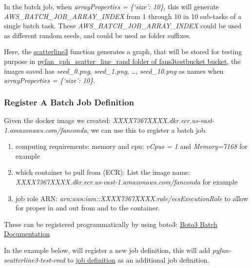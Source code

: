 \documentclass[
]{book}
\providecommand{\tightlist}{%
  \setlength{\itemsep}{0pt}\setlength{\parskip}{0pt}}
\begin{document}
In the batch job, when \emph{arrayProperties = \{`size': 10\}}, this will generate \emph{AWS\_BATCH\_JOB\_ARRAY\_INDEX} from 1 through 10 in 10 sub-tasks of a single batch task. These \emph{AWS\_BATCH\_JOB\_ARRAY\_INDEX} could be used as different random seeds, and could be used as folder suffixes.

Here, the \href{https://github.com/FanWangEcon/pyfan/blob/master/pyfan/graph/exa/scatterline3.py}{scatterline3} function generates a graph, that will be stored for testing purpose in \href{https://s3.console.aws.amazon.com/s3/buckets/fans3testbucket/pyfan_gph_scatter_line_rand/?region=us-east-1\&tab=overview}{pyfan\_gph\_scatter\_line\_rand folder of fans3testbucket bucket}, the images saved has \emph{seed\_0.png}, \emph{seed\_1.png}, \ldots, \emph{seed\_10.png} as names when \emph{arrayProperties = \{`size': 10\}}.

\hypertarget{register-a-batch-job-definition}{%
\subsubsection{Register A Batch Job Definition}\label{register-a-batch-job-definition}}

Given the docker image we created: \emph{XXXX7367XXXX.dkr.ecr.us-east-1.amazonaws.com/fanconda}, we can use this to register a batch job.

\begin{enumerate}
\def\labelenumi{\arabic{enumi}.}
\tightlist
\item
  computing requirements: memory and cpu: \emph{vCpus = 1} and \emph{Memory=7168} for example
\item
  which container to pull from (ECR): List the image name: \emph{XXXX7367XXXX.dkr.ecr.us-east-1.amazonaws.com/fanconda} for example
\item
  job role ARN: \emph{arn:aws:iam::XXXX7367XXXX:role/ecsExecutionRole} to allow for proper in and out from and to the container.
\end{enumerate}

These can be registered programmatically by using boto3: \href{https://boto3.amazonaws.com/v1/documentation/api/latest/reference/services/batch.html}{Boto3 Batch Documentation}

In the example below, will register a new job definition, this will add \emph{pyfan-scatterline3-test-rmd} to \href{https://console.aws.amazon.com/batch/v2/home?region=us-east-1\#job-definition}{job definition} as an additional job definition.
\end{document}
